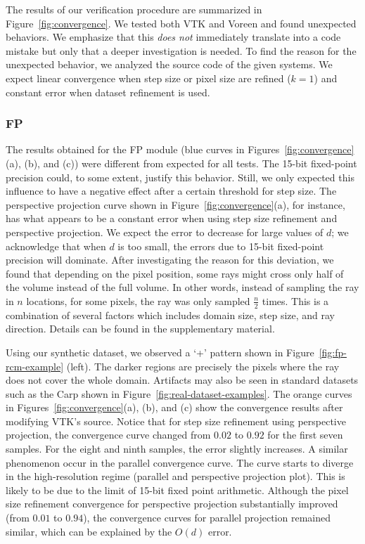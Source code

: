 The results of our verification procedure are summarized in
Figure~\ref{fig:convergence}.  We tested both VTK and Voreen and found
unexpected behaviors.  We emphasize that this \emph{does not}
immediately translate into a code mistake but only that a deeper
investigation is needed. To find the reason for the unexpected behavior, we
analyzed the source code of the given systems.  We expect linear
convergence when step size or pixel size are refined ($k = 1$) and
constant error when dataset refinement is used.

\subsubsection{FP}
The results obtained for the FP module (blue curves in
Figures~\ref{fig:convergence}(a), (b), and (c)) were different from
expected for all tests. The 15-bit fixed-point precision could, to
some extent, justify this behavior. Still, we only expected this
influence to have a negative effect after a certain threshold for step
size. The perspective projection curve shown in
Figure~\ref{fig:convergence}(a), for instance, has what appears to be
a constant error when using step size refinement and perspective
projection. We expect the error to decrease for large values of $d$;
we acknowledge that when $d$ is too small, the errors due to 15-bit fixed-point
precision will dominate.
After investigating the reason for this deviation, we found that
depending on the pixel position, some rays might cross only half of
the volume instead of the full volume. In other words, instead of
sampling the ray in $n$ locations, for some pixels, the ray was only
sampled $\frac{n}{2}$ times. This is a combination of several factors
which includes domain size, step size, and ray direction. Details 
can be found in the supplementary material.

Using our synthetic dataset, we observed a `+' pattern shown in
Figure~\ref{fig:fp-rcm-example} (left). The darker regions are
precisely the pixels where the ray does not cover the whole
domain. Artifacts may also be seen in standard datasets such as the
Carp shown in Figure~\ref{fig:real-dataset-examples}.  The orange
curves in Figures~\ref{fig:convergence}(a), (b), and (c) show the
convergence results after modifying VTK's source.  Notice that for
step size refinement using perspective projection, the convergence
curve changed from $0.02$ to $0.92$ for the first seven samples. For the eight 
and ninth samples, the error slightly increases. A similar phenomenon occur
in the parallel convergence curve. The curve starts to
diverge in the high-resolution regime (parallel and perspective projection plot).
This is likely to be due to the limit of 15-bit fixed point arithmetic.  Although 
the  pixel size refinement convergence for perspective projection substantially improved 
(from $0.01$ to $0.94$), the convergence curves for parallel projection remained similar, 
which can be explained by the $O(d)$ error.


